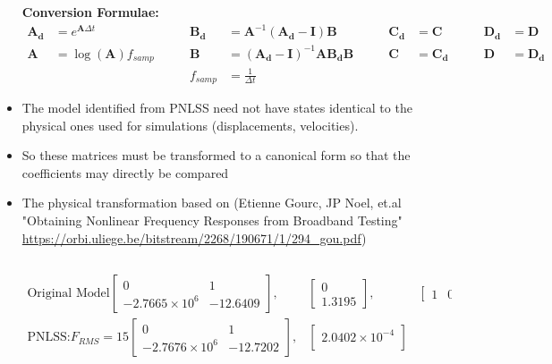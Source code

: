 \documentclass[aspectratio=169]{beamer}
\begin{document}
\begin{frame}[allowframebreaks]
\begin{itemize}
    \textbf{Conversion Formulae:}
    \begin{alignat*}{8}
      \mathbf{A_d} &= e^{\mathbf{A}\Delta t}\qquad &\mathbf{B_d} &=
      \mathbf{A}^{-1}\left(\mathbf{A_d}-\mathbf{I}\right)
      \mathbf{B}\qquad &\mathbf{C_d} &= \mathbf{C}\qquad &\mathbf{D_d} &=
      \mathbf{D}\\
      \mathbf{A} &= \log\left(\mathbf{A}\right)f_{samp}\qquad &\mathbf{B} &=
      {\left(\mathbf{A_d}-\mathbf{I}\right)}^{-1} \mathbf{A} \mathbf{B_d}
      \mathbf{B}\qquad &\mathbf{C} &= \mathbf{C_d}\qquad &\mathbf{D} &=
      \mathbf{D_d}\\
      && f_{samp} &= \frac{1}{\Delta t}
    \end{alignat*}
  \item The model identified from PNLSS need not have states identical
    to the physical ones used for simulations (displacements,
    velocities). 
  \item So these matrices must be transformed to a canonical form so
    that the coefficients may directly be compared
  \item The physical transformation based on (Etienne Gourc, JP Noel,
    et.al "Obtaining Nonlinear Frequency Responses from Broadband
    Testing"
    \url{https://orbi.uliege.be/bitstream/2268/190671/1/294_gou.pdf})
    \begin{columns}
      \begin{column}{0.5\linewidth}
        \begin{alignat*}{4}
          \text{Original Model} \begin{bmatrix}
            0 & 1\\ -2.7665\times 10^6 & -12.6409
          \end{bmatrix}, &\begin{bmatrix} 0\\
            1.3195 \end{bmatrix}, &\begin{bmatrix} 1 &
            0 \end{bmatrix}, &\begin{bmatrix} 0 \end{bmatrix}\\
          \text{PNLSS:} F_{RMS}=15 \begin{bmatrix}
            0 & 1\\ -2.7676\times 10^6 & -12.7202
          \end{bmatrix}, &\begin{bmatrix} 2.0402\times 10^{-4}\\

\end{bmatrix}
\end{alignat*}
\end{column}
\end{columns}
\end{itemize}
\end{frame}
\end{document}
